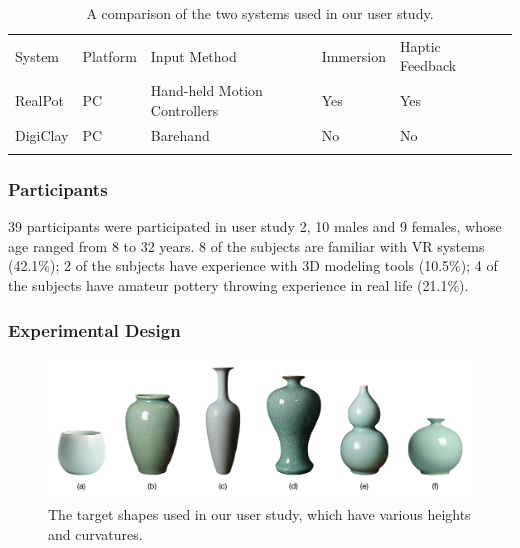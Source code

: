 \documentclass{svjour3}                     %
\begin{document}
\begin{table}
\caption{A comparison of the two systems used in our user study.}
\label{tab:3}       %
\begin{tabular}{llllll}
\hline\noalign{\smallskip}
System & Platform & Input Method & Immersion & Haptic Feedback \\
\noalign{\smallskip}\hline\noalign{\smallskip}
RealPot & PC & Hand-held Motion Controllers & Yes & Yes \\
DigiClay & PC & Barehand & No & No \\
\noalign{\smallskip}\hline
\end{tabular}
\end{table}













\subsubsection{Participants}
39 participants were participated in user study 2, 10 males and 9 females, whose age ranged from 8 to 32 years. 8 of the subjects are familiar with VR systems (42.1\%); 2 of the subjects have experience with 3D modeling tools (10.5\%); 4 of the subjects have amateur pottery throwing experience in real life (21.1\%).













\subsubsection{Experimental Design}

\begin{figure}
\includegraphics[width=\textwidth]{fig12}
\caption{The target shapes used in our user study, which have various heights and curvatures.}
\label{fig:target}
\end{figure}
\end{document}
